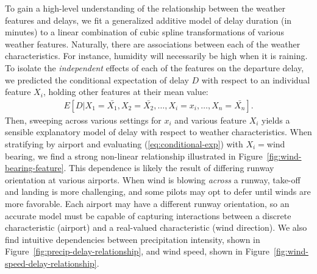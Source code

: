 \documentclass[twocolumn]{article}
\begin{document}
To gain a high-level understanding of the relationship between the weather features and delays, we fit a generalized additive model \citep{hastie1990generalized} of delay duration (in minutes) to a linear combination of cubic spline transformations of various weather features. Naturally, there are associations between each of the weather characteristics. For instance, humidity will necessarily be high when it is raining. To isolate the \emph{independent} effects of each of the features on the departure delay, we predicted the conditional expectation of delay $D$ with respect to an individual feature $X_i$, holding other features at their mean value:
\begin{align}
    \label{eq:conditional-exp}
    E[D|X_1=\bar{X_1}, X_2=\bar{X_2}, \ldots, X_i = x_i, \ldots, X_n = \bar{X_n}].
\end{align}
Then, sweeping across various settings for $x_i$ and various feature $X_i$ yields a sensible explanatory model of delay with respect to weather characteristics. When stratifying by airport and evaluating (\ref{eq:conditional-exp}) with $X_i=$wind bearing, we find a strong non-linear relationship illustrated in Figure~\ref{fig:wind-bearing-feature}. 
This dependence is likely the result of differing runway orientation at various airports. When wind is blowing \emph{across} a runway, take-off and landing is more challenging, and some pilots may opt to defer until winds are more favorable. Each airport may have a different runway orientation, so an accurate model must be capable of capturing interactions between a discrete characteristic (airport) and a real-valued characteristic (wind direction).
We also find intuitive dependencies between precipitation intensity, shown in Figure~\ref{fig:precip-delay-relationship}, and wind speed, shown in Figure~\ref{fig:wind-speed-delay-relationship}.
\end{document}

